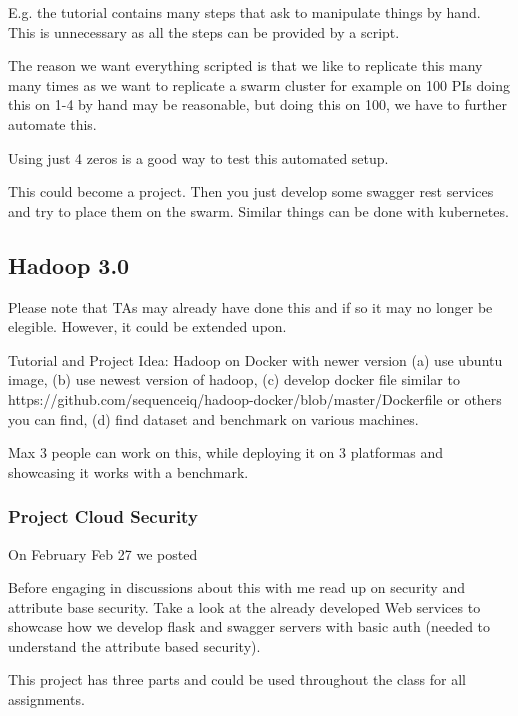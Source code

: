 E.g. the tutorial contains many steps that ask to manipulate things by
hand. This is unnecessary as all the steps can be provided by a
script. 

The reason we want everything scripted is that we like to replicate
this many many times as we want to replicate a swarm cluster for
example on 100 PIs doing this on 1-4 by hand may be reasonable, but
doing this on 100, we have to further automate this.

Using just 4 zeros is a good way to test this automated setup.  

This could become a project. Then you just develop some swagger rest
services and try to place them on the swarm. Similar things can be
done with kubernetes.

\subsection{Hadoop 3.0}

\begin{IU}
Please note that TAs may already have done this and if so it may no
longer be elegible. However, it could be extended upon.
\end{IU}

Tutorial and Project Idea: Hadoop on Docker with newer version
(a) use ubuntu image, (b) use newest version of hadoop, (c) develop
docker file similar to
https://github.com/sequenceiq/hadoop-docker/blob/master/Dockerfile or
others you can find, (d) find dataset and benchmark on various machines.

Max 3 people can work on this, while deploying it on 3 platformas and
showcasing it works with a benchmark.
 

\subsubsection{Project Cloud Security}

On February Feb 27 we posted

Before engaging in discussions about this with me read
up on security and attribute base security. Take a look at the already
developed Web services to showcase how we develop flask and swagger
servers with basic auth (needed to understand the attribute based
security).
 

This project has three parts and could be used throughout the class
for all assignments.

